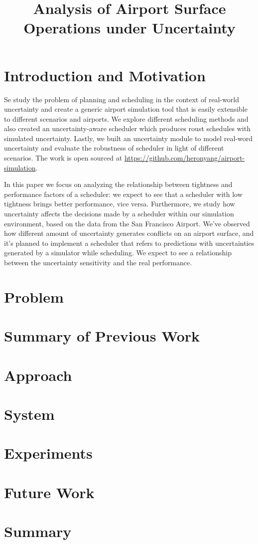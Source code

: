 \documentclass[letterpaper, 10 pt, conference]{ieeeconf}
\title{Analysis of Airport Surface Operations under Uncertainty}
\author{Robert Morris$^{1}$ \and Heron Yang$^{2}  \and Corina Pasareanu$^{3}$ \\ %
\thanks{$^{3}$ Heron Yang {\tt\small heronyang@cmu.edu}} \\
\thanks{$^{1}$ Robert Morris {\tt\small robert.a.morris@nasa.gov}} \\%
\thanks{$^{2}$ Corina Pasareanu {\tt\small corina.pasareanu@west.cmu.edu}}%
}
\begin{document}
\maketitle
\begin{abstract}
\end{abstract}
\section{Introduction and Motivation}

Se study the problem of planning and scheduling in the context of real-world uncertainty and create a generic airport simulation tool that is easily extensible to different scenarios and airports. We explore different scheduling methods  and also created an uncertainty-aware scheduler which produces roust schedules with simulated uncertainty. Lastly, we built an uncertainty module to model real-word uncertainty and evaluate the robustness of scheduler in light of different scenarios. The work is open sourced at \url{https://github.com/heronyang/airport-simulation}.

In this paper we focus on analyzing the relationship between tightness and performance factors of a scheduler: we expect to see that a scheduler with low tightness brings better performance, vice versa. 
Furthermore, we study how uncertainty affects the decisions made by a scheduler within our simulation environment, based on the data from the San Francisco Airport. We’ve observed how different amount of uncertainty generates conflicts on an airport surface, and it’s planned to implement a scheduler that refers to predictions with uncertainties generated by a simulator while scheduling. We expect to see a relationship between the uncertainty sensitivity and the real performance.



\section{Problem}


\section{Summary of Previous Work}
\section{Approach}
\section{System}
\section{Experiments}
\section{Future Work}
\section{Summary}


\end{document}
